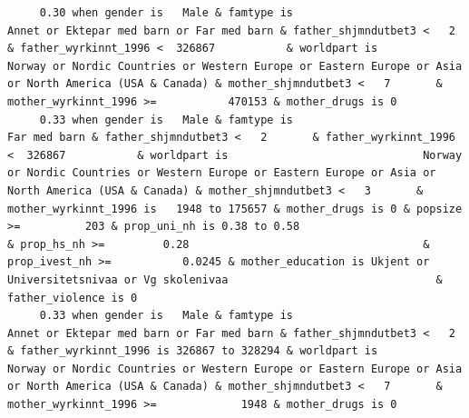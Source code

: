 \documentclass[
  letterpaper,
  DIV=11,
  numbers=noendperiod]{scrreprt}
\begin{document}
\begin{verbatim}
     0.30 when gender is   Male & famtype is                        Annet or Ektepar med barn or Far med barn & father_shjmndutbet3 <   2       & father_wyrkinnt_1996 <  326867           & worldpart is                              Norway or Nordic Countries or Western Europe or Eastern Europe or Asia or North America (USA & Canada) & mother_shjmndutbet3 <   7       & mother_wyrkinnt_1996 >=           470153 & mother_drugs is 0                                                                                                                                                                                                                                                                                                                                                                                                                                         
     0.33 when gender is   Male & famtype is                                                     Far med barn & father_shjmndutbet3 <   2       & father_wyrkinnt_1996 <  326867           & worldpart is                              Norway or Nordic Countries or Western Europe or Eastern Europe or Asia or North America (USA & Canada) & mother_shjmndutbet3 <   3       & mother_wyrkinnt_1996 is   1948 to 175657 & mother_drugs is 0 & popsize >=          203 & prop_uni_nh is 0.38 to 0.58                                      & prop_hs_nh >=         0.28                                    & prop_ivest_nh >=           0.0245 & mother_education is Ukjent or Universitetsnivaa or Vg skolenivaa                                & father_violence is 0                                                                                                               
     0.33 when gender is   Male & famtype is                        Annet or Ektepar med barn or Far med barn & father_shjmndutbet3 <   2       & father_wyrkinnt_1996 is 326867 to 328294 & worldpart is                              Norway or Nordic Countries or Western Europe or Eastern Europe or Asia or North America (USA & Canada) & mother_shjmndutbet3 <   7       & mother_wyrkinnt_1996 >=             1948 & mother_drugs is 0                                                                                                                                                                                                                                                                                                                                                                                                                                         

\end{verbatim}
\end{document}
